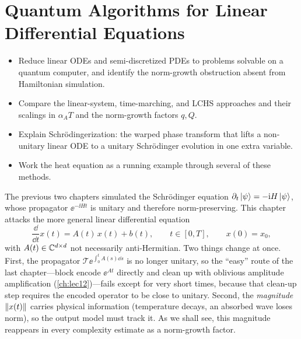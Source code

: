 \chapter{Quantum Algorithms for Linear Differential Equations}
\label{ch:lec13}

\begin{objectives}
\begin{itemize}[leftmargin=1.4em,nosep]
  \item Reduce linear ODEs and semi-discretized PDEs to problems solvable on a quantum
        computer, and identify the norm-growth obstruction absent from Hamiltonian simulation.
  \item Compare the linear-system, time-marching, and LCHS approaches and their scalings in
        $\alpha_A T$ and the norm-growth factors $q,Q$.
  \item Explain Schr\"odingerization: the warped phase transform that lifts a non-unitary
        linear ODE to a unitary Schr\"odinger evolution in one extra variable.
  \item Work the heat equation as a running example through several of these methods.
\end{itemize}
\end{objectives}

The previous two chapters simulated the Schr\"odinger equation
$\partial_t\ket\psi=-\mathrm{i} H\ket\psi$, whose propagator $\ee^{-\ii Ht}$ is unitary and
therefore norm-preserving. This chapter attacks the more general linear differential equation
\begin{equation}
  \frac{\dd}{\dd t}x(t)=A(t)\,x(t)+b(t),\qquad t\in[0,T],\qquad x(0)=x_0,
  \label{eq:lec13-ode}
\end{equation}
with $A(t)\in\mathbb{C}^{d\times d}$ not necessarily anti-Hermitian. Two things change at once. First,
the propagator $\mathcal T\ee^{\int_0^t A(s)\dd s}$ is no longer unitary, so the ``easy'' route
of the last chapter---block encode $\ee^{At}$ directly and clean up with oblivious amplitude
amplification (\cref{ch:lec12})---fails except for very short times, because that clean-up step
requires the encoded operator to be close to unitary. Second, the \emph{magnitude}
$\left\lVert x(t) \right\rVert$ carries physical information (temperature decays, an absorbed wave loses norm),
so the output model must track it. As we shall see, this magnitude reappears in every
complexity estimate as a norm-growth factor.

